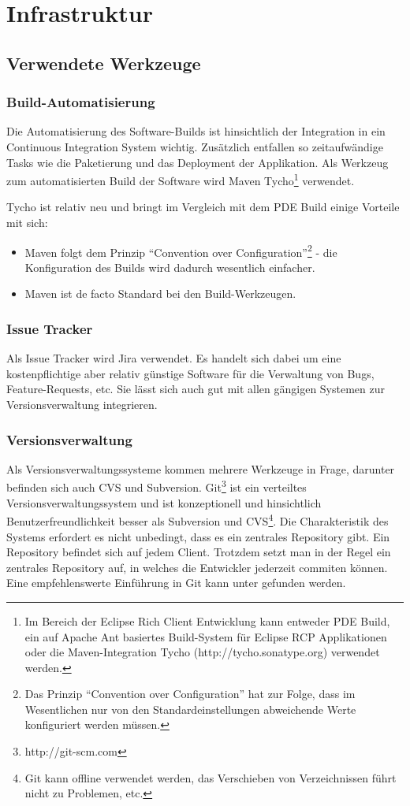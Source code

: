 \chapter{Infrastruktur}\label{konzept_3}
\section{Verwendete Werkzeuge}
\subsection{Build-Automatisierung}
Die Automatisierung des Software-Builds ist hinsichtlich der Integration in ein Continuous Integration System wichtig. Zusätzlich entfallen so zeitaufwändige Tasks wie die Paketierung und das Deployment der Applikation.
Als Werkzeug zum automatisierten Build der Software wird Maven Tycho\footnote{Im Bereich der Eclipse Rich Client Entwicklung kann entweder PDE Build, ein auf Apache Ant basiertes Build-System für Eclipse RCP Applikationen\cite{vogelZapfPdeBuild} oder die Maven-Integration Tycho (http://tycho.sonatype.org) verwendet werden.} verwendet.

Tycho ist relativ neu und bringt im Vergleich mit dem PDE Build einige Vorteile mit sich:
\begin{itemize}
	\item Maven folgt dem Prinzip ``Convention over Configuration''\footnote{Das Prinzip ``Convention over Configuration'' hat zur Folge, dass im Wesentlichen nur von den Standardeinstellungen abweichende Werte konfiguriert werden müssen.} - die Konfiguration des Builds wird dadurch wesentlich einfacher.
	\item Maven ist de facto Standard bei den Build-Werkzeugen.
\end{itemize}

\subsection{Issue Tracker}\label{issue_tracker}
Als Issue Tracker wird Jira verwendet. Es handelt sich dabei um eine kostenpflichtige aber relativ günstige Software für die Verwaltung von Bugs, Feature-Requests, etc. Sie lässt sich auch gut mit allen gängigen Systemen zur Versionsverwaltung integrieren.

\subsection{Versionsverwaltung}
Als Versionsverwaltungssysteme kommen mehrere Werkzeuge in Frage, darunter befinden sich auch CVS und Subversion. Git\footnote{http://git-scm.com} ist ein verteiltes Versionsverwaltungssystem und ist konzeptionell und hinsichtlich Benutzerfreundlichkeit besser als Subversion und CVS\footnote{Git kann offline verwendet werden, das Verschieben von Verzeichnissen führt nicht zu Problemen, etc.}. Die Charakteristik des Systems erfordert es nicht unbedingt, dass es ein zentrales Repository gibt. Ein Repository befindet sich auf jedem Client. Trotzdem setzt man in der Regel ein zentrales Repository auf, in welches die Entwickler jederzeit commiten können. Eine empfehlenswerte Einführung in Git kann unter \cite{dilger201111}  gefunden werden.

